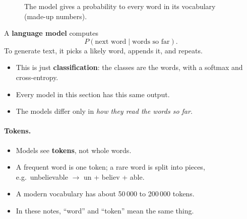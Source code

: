 \documentclass[12pt, a4paper]{article}
\newcommand{\tok}[1]{\textsf{#1}}   %
\begin{document}
\begin{figure}[H]
  \centering
  \caption{The model gives a probability to every word in its vocabulary
    (made-up numbers).}
  \label{fig:nextword}
\end{figure}

\begin{resultbox}
  A \textbf{language model} computes
  \[
    P(\text{next word} \mid \text{words so far}).
  \]
  To generate text, it picks a likely word, appends it, and repeats.
\end{resultbox}

\begin{itemize}
  \item This is just \textbf{classification}: the classes are the words, with
        a softmax and cross-entropy.
  \item Every model in this section has this same output.
  \item The models differ only in \emph{how they read the words so far}.
\end{itemize}

\paragraph{Tokens.}
\begin{itemize}
  \item Models see \textbf{tokens}, not whole words.
  \item A frequent word is one token; a rare word is split into pieces, e.g.\
        \tok{unbelievable} $\to$ \tok{un} + \tok{believ} + \tok{able}.
  \item A modern vocabulary has about 50\,000 to 200\,000 tokens.
  \item In these notes, ``word'' and ``token'' mean the same thing.
\end{itemize}
\end{document}
